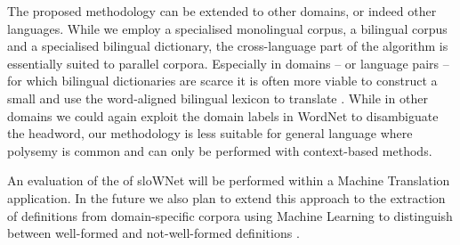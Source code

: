 \documentclass[output=paper]{LSP/langsci}
\begin{document}
The proposed methodology can be extended to other domains, or indeed other languages. While we employ a specialised monolingual corpus, a bilingual corpus and a specialised bilingual dictionary, the cross-language part of the al\-go\-rithm is essentially suited to parallel corpora. Especially in domains -- or language pairs -- for which bilingual dictionaries are scarce it is often more viable to construct a small  and use the word-aligned bilingual lexicon to translate . While in other domains we could again exploit the domain labels in WordNet to disambiguate the headword, our methodology is less suitable for general language where polysemy is common and  can only be performed with context-based methods.

An evaluation of the  of sloWNet will be performed within a Machine Translation application. In the future we also plan to extend this approach to the extraction of definitions from domain-specific corpora using Machine Learning to distinguish between well-formed and not-well-formed definitions \citep{Fišer2010}.

{\sloppy 
\printbibliography[heading=subbibliography,notkeyword=this]
}
\end{document}
